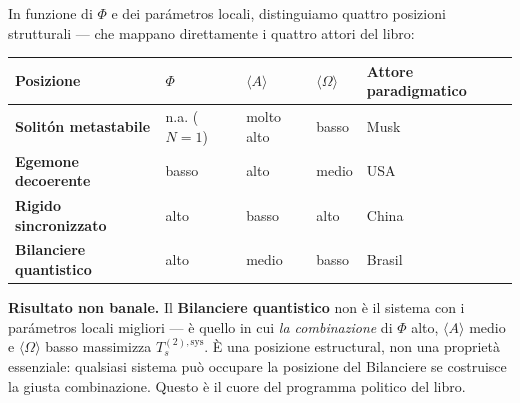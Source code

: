 In funzione di \(\Phi\) e dei parámetros locali, distinguiamo quattro
posizioni strutturali --- che mappano direttamente i quattro attori del
libro:

{\def\LTcaptype{none} %
{\small\begin{longtable}[]{@{}
  >{\raggedright\arraybackslash}p{}
  >{\raggedright\arraybackslash}p{}
  >{\raggedright\arraybackslash}p{}
  >{\raggedright\arraybackslash}p{}
  >{\raggedright\arraybackslash}p{}@{}}
\toprule\noalign{}
\begin{minipage}[b]{\linewidth}\raggedright
Posizione
\end{minipage} & \begin{minipage}[b]{\linewidth}\raggedright
\(\Phi\)
\end{minipage} & \begin{minipage}[b]{\linewidth}\raggedright
\(\langle A\rangle\)
\end{minipage} & \begin{minipage}[b]{\linewidth}\raggedright
\(\langle\Omega\rangle\)
\end{minipage} & \begin{minipage}[b]{\linewidth}\raggedright
Attore paradigmatico
\end{minipage} \\
\midrule\noalign{}
\endhead
\bottomrule\noalign{}
\endlastfoot
\textbf{Solitón metastabile} & n.a. (\(N=1\)) & molto alto & basso &
Musk \\
\textbf{Egemone decoerente} & basso & alto & medio & USA \\
\textbf{Rigido sincronizzato} & alto & basso & alto & China \\
\textbf{Bilanciere quantistico} & alto & medio & basso & Brasil \\
\end{longtable}}
}

\Proved{} \textbf{Risultato non banale.} Il \textbf{Bilanciere
quantistico} non è il sistema con i parámetros locali migliori --- è
quello in cui \emph{la combinazione} di \(\Phi\) alto,
\(\langle A\rangle\) medio e \(\langle\Omega\rangle\) basso massimizza
\(T_s^{(2),\text{sys}}\). È una posizione estructural, non una proprietà
essenziale: qualsiasi sistema può occupare la posizione del Bilanciere
se costruisce la giusta combinazione. Questo è il cuore del programma
politico del libro.



